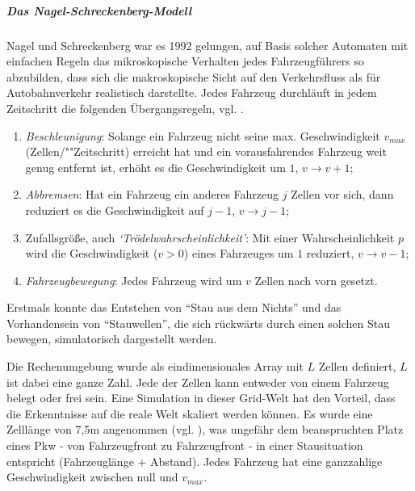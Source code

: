 \subparagraph{Das Nagel-Schreckenberg-Modell}

Nagel und Schreckenberg war es 1992 gelungen, auf Basis solcher Automaten mit einfachen Regeln das mikroskopische Verhalten jedes Fahrzeugführers so abzubilden, dass sich die makroskopische Sicht auf den Verkehrsfluss als für Autobahnverkehr realistisch darstellte. 
Jedes Fahrzeug durchläuft in jedem Zeitschritt die folgenden Übergangsregeln, vgl. \cite{na-sch}. 

\begin{enumerate}
	\item \textit{Beschleunigung}: Solange ein Fahrzeug nicht seine max. Geschwindigkeit $v_{max}$ (Zellen/""Zeitschritt) erreicht hat und ein vorausfahrendes Fahrzeug weit genug entfernt ist, erhöht es die Geschwindigkeit um $1$, $v \rightarrow v+1$;
	\item \textit{Abbremsen}: Hat ein Fahrzeug ein anderes Fahrzeug $j$ Zellen vor sich, dann reduziert es die Geschwindigkeit auf $j-1$, $v \rightarrow j-1$;
	\item Zufallsgröße, auch \textit{\enquote*{Trödelwahrscheinlichkeit}}: Mit einer Wahrscheinlichkeit $p$ wird die Geschwindigkeit ($v > 0$) eines Fahrzeuges um $1$ reduziert, $v \rightarrow v-1$;
	\item \textit{Fahrzeugbewegung}: Jedes Fahrzeug wird um $v$ Zellen nach vorn gesetzt.
\end{enumerate}

\noindent
Erstmals konnte das Entstehen von \enquote{Stau aus dem Nichts} und das Vorhandensein von \enquote{Stauwellen}, die sich rückwärts durch einen solchen Stau bewegen, simulatorisch dargestellt werden.

Die Rechenumgebung wurde als eindimensionales Array mit $L$ Zellen definiert, $L$ ist dabei eine ganze Zahl. 
Jede der Zellen kann entweder von einem Fahrzeug belegt oder frei sein. 
Eine Simulation in dieser Grid-Welt hat den Vorteil, dass die Erkenntnisse auf die reale Welt skaliert werden können. 
Es wurde eine Zelllänge von 7,5\nolinebreak[4] m angenommen (vgl. \cite[S. 2227]{na-sch}), was ungefähr dem beanspruchten Platz eines Pkw - von Fahrzeugfront zu Fahrzeugfront - in einer Stausituation entspricht (Fahrzeuglänge + Abstand). 
Jedes Fahrzeug hat eine ganzzahlige Geschwindigkeit zwischen null und $v_{max}$.

